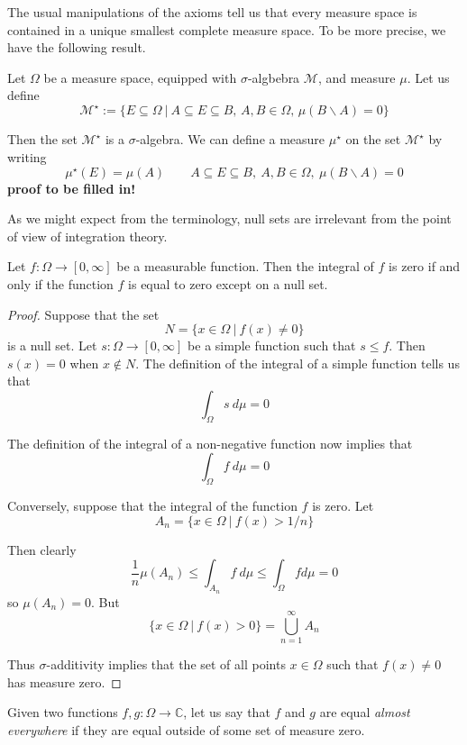 The usual manipulations of the axioms tell us that every measure space is contained in a unique smallest complete measure space.  To be more precise, we have the following result.

\begin{proposition}
Let $\Omega$ be a measure space, equipped with $\sigma$-algbebra $\mathcal M$, and measure $\mu$.  Let us define 
$${\mathcal M}^\star := \{ E\subseteq \Omega \ |\ A\subseteq E\subseteq B,\, A,B\in \Omega ,\, \mu (B\backslash A) = 0 \}$$

Then the set ${\mathcal M}^\star$ is a $\sigma$-algebra.  We can define a measure $\mu^\star$ on the set ${\mathcal M}^\star$ by writing
$$\mu^\star (E) = \mu (A) \qquad A\subseteq E\subseteq B,\ A,B\in \Omega ,\ \mu (B\backslash A) =0$$
\textbf{proof to be filled in!}
\end{proposition}

As we might expect from the terminology, null sets are irrelevant from the point of view of integration theory.

\begin{theorem}
Let $f\colon \Omega \rightarrow [0,\infty ]$ be a measurable function.  Then the integral of $f$ is zero if and only if the function $f$ is equal to zero except on a null set.
\end{theorem}

\begin{proof}
Suppose that the set
$$N = \{ x\in \Omega \ |\ f(x)\neq 0 \}$$
is a null set.  Let $s\colon \Omega \rightarrow [0,\infty ]$ be a simple function such that $s\leq f$.  Then $s(x)=0$ when $x\not\in N$.  The definition of the integral of a simple function tells us that
$$\int_\Omega s \ d\mu =0$$

The definition of the integral of a non-negative function now implies that
$$\int_\Omega f\ d\mu =0$$

Conversely, suppose that the integral of the function $f$ is zero.  Let
$$A_n = \{ x\in \Omega \ |\ f(x)> 1/n \}$$

Then clearly
$$\frac{1}{n} \mu (A_n ) \leq \int_{A_n} f\ d\mu \leq \int_\Omega f d\mu =0$$
so $\mu (A_n ) =0$.  But
$$\{ x\in \Omega \ |\ f(x) >0 \} = \bigcup_{n=1}^\infty A_n$$

Thus $\sigma$-additivity implies that the set of all points $x\in \Omega$ such that $f(x)\neq 0$ has measure zero.
\end{proof}

Given two functions $f,g\colon \Omega \rightarrow {\mathbb C}$, let us say that $f$ and $g$ are equal {\em almost everywhere} if they are equal outside of some set of measure zero.

